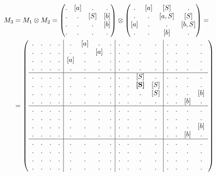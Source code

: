 \begin{example}
\begin{align}
M_3 &= M_1 \otimes M_2 = 
\begin{pmatrix} 
. & [a] & . & . \\
. & . & [S] & [b] \\
. & . & . & [b] \\
. & . & . & . 
\end{pmatrix}
\otimes 
\begin{pmatrix} 
. & [a] & [S] & . \\
. & . & [a,S] & [S] \\
[a] & . & . & [b,S] \\
. & . & [b] & . 
\end{pmatrix}
=\notag\\
&=
\left(\begin{array}{c c c c | c c c c | c c c c | c c c c } 
. & . & . & .  &  . & [a] & . & .  &  . & . & . & .    &  . & . & . & .   \\
. & . & . & .  &  . & . & [a] & .  &  . & . & . & .    &  . & . & . & .   \\
. & . & . & .  &  [a] & . & . & .  &  . & . & . & .    &  . & . & . & .   \\
. & . & . & .  &  . & . & . & .    &  . & . & . & .    &  . & . & . & .   \\
\hline
. & . & . & .  &  . & . & . & .    &  . & . & [S]          & .    &  . & . & . & .   \\
. & . & . & .  &  . & . & . & .    &  . & . & \textbf{[S]} & [S]  &  . & . & . & .   \\
. & . & . & .  &  . & . & . & .    &  . & . & .            & [S]  &  . & . & . & [b] \\
. & . & . & .  &  . & . & . & .    &  . & . & .            & .    &  . & . & [b] & . \\
\hline
. & . & . & .  &  . & . & . & .    &  . & . & . & .    &  . & . & . & .   \\
. & . & . & .  &  . & . & . & .    &  . & . & . & .    &  . & . & . & .   \\
. & . & . & .  &  . & . & . & .    &  . & . & . & .    &  . & . & . & [b] \\
. & . & . & .  &  . & . & . & .    &  . & . & . & .    &  . & . & [b] & . \\
\hline
. & . & . & .  &  . & . & . & .    &  . & . & . & .    &  . & . & . & .   \\
. & . & . & .  &  . & . & . & .    &  . & . & . & .    &  . & . & . & .   \\
. & . & . & .  &  . & . & . & .    &  . & . & . & .    &  . & . & . & .   \\
. & . & . & .  &  . & . & . & .    &  . & . & . & .    &  . & . & . & . 
\end{array}\right)
\end{align}


\end{example}
